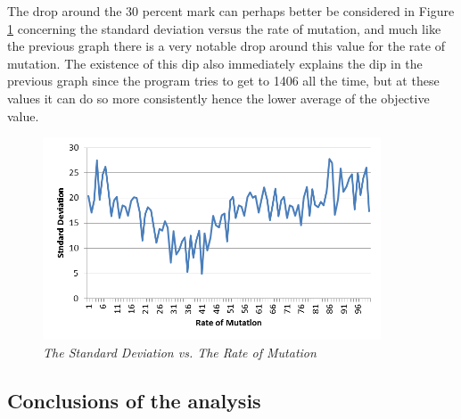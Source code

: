 The drop around the 30 percent mark can perhaps better be considered in Figure \ref{SDRM} concerning the standard deviation versus the rate of mutation, and much like the previous graph there is a very notable drop around this value for the rate of mutation. The existence of this dip also immediately explains the dip in the previous graph since the program tries to get to 1406 all the time, but at these values it can do so more consistently hence the lower average of the objective value.
\par

\begin{figure}[h] 
	\centering
	\includegraphics[height=6cm]{SDRM}
	\caption{\textsl{The Standard Deviation vs. The Rate of Mutation}}
	\label{SDRM}
\end{figure}

\subsection{Conclusions of the analysis}

